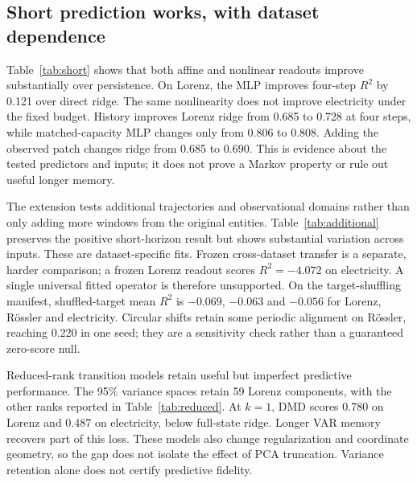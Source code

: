 \documentclass[10pt,a4paper,twocolumn]{article}
\begin{document}
\subsection{Short prediction works, with dataset dependence}
Table~\ref{tab:short} shows that both affine and nonlinear readouts improve substantially over persistence.
On Lorenz, the MLP improves four-step $R^2$ by 0.121 over direct ridge.
The same nonlinearity does not improve electricity under the fixed budget.
History improves Lorenz ridge from 0.685 to 0.728 at four steps, while matched-capacity MLP changes only from 0.806 to 0.808.
Adding the observed patch changes ridge from 0.685 to 0.690.
This is evidence about the tested predictors and inputs; it does not prove a Markov property or rule out useful longer memory.

The extension tests additional trajectories and observational domains rather than only adding more windows from the original entities.
Table~\ref{tab:additional} preserves the positive short-horizon result but shows substantial variation across inputs.
These are dataset-specific fits.
Frozen cross-dataset transfer is a separate, harder comparison; a frozen Lorenz readout scores $R^2=-4.072$ on electricity.
A single universal fitted operator is therefore unsupported.
On the target-shuffling manifest, shuffled-target mean $R^2$ is $-0.069$, $-0.063$ and $-0.056$ for Lorenz, R\"ossler and electricity.
Circular shifts retain some periodic alignment on R\"ossler, reaching 0.220 in one seed; they are a sensitivity check rather than a guaranteed zero-score null.

\begin{table}[t]
\centering\small
\setlength{\tabcolsep}{3pt}

\caption{Validation $R^2$ on additional datasets, eight unseen entities each. Column suffixes 1 and 4 give the forecast horizon in analysis steps. Ridge and MLP are direct fits; MLP averages three seeds.}
\label{tab:additional}
\end{table}

Reduced-rank transition models retain useful but imperfect predictive performance.
The 95\% variance spaces retain 59 Lorenz components, with the other ranks reported in Table~\ref{tab:reduced}.
At $k=1$, DMD scores 0.780 on Lorenz and 0.487 on electricity, below full-state ridge.
Longer VAR memory recovers part of this loss.
These models also change regularization and coordinate geometry, so the gap does not isolate the effect of PCA truncation.
Variance retention alone does not certify predictive fidelity.
\end{document}

